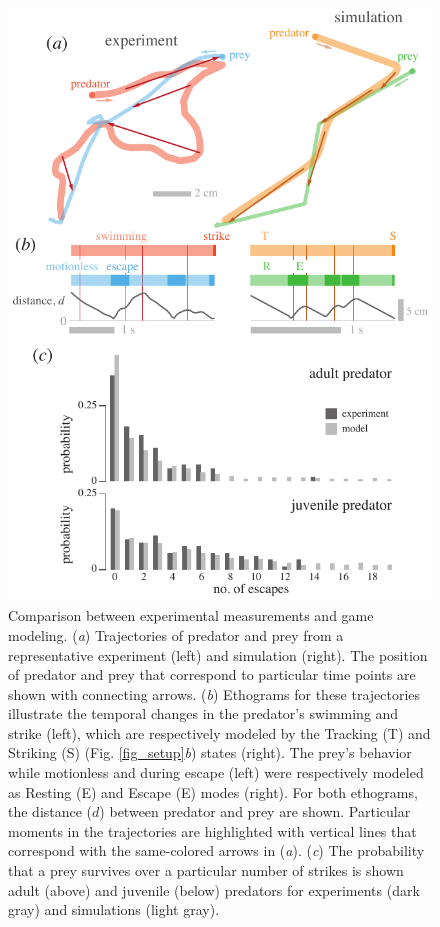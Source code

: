 \documentclass[]{rsos}%
\begin{document}
\begin{figure}[!h]
\centering
	\includegraphics[width=4.5in]{fig_trajectories}
\caption{
Comparison between experimental measurements and game modeling. 
(\textit{a}) Trajectories of predator and prey from a representative experiment (left) and simulation (right). 
The position of predator and prey that correspond to particular time points are shown with connecting arrows.
(\textit{b}) Ethograms for these trajectories illustrate the temporal changes in the predator's swimming and strike (left), which are respectively modeled by the Tracking (T) and Striking (S) (Fig. \ref{fig_setup}\textit{b}) states (right). 
The prey's behavior while motionless and during escape (left) were respectively modeled as Resting (E) and Escape (E) modes (right).
For both ethograms, the distance ($d$) between predator and prey are shown.
Particular moments in the trajectories are highlighted with vertical lines that correspond with the same-colored arrows in (\textit{a}).
(\textit{c}) The probability that a prey survives over a particular number of strikes is shown adult  (above) and juvenile (below) predators for experiments (dark gray) and simulations (light gray).   
}
\label{fig_traj}
\end{figure}
\end{document}
